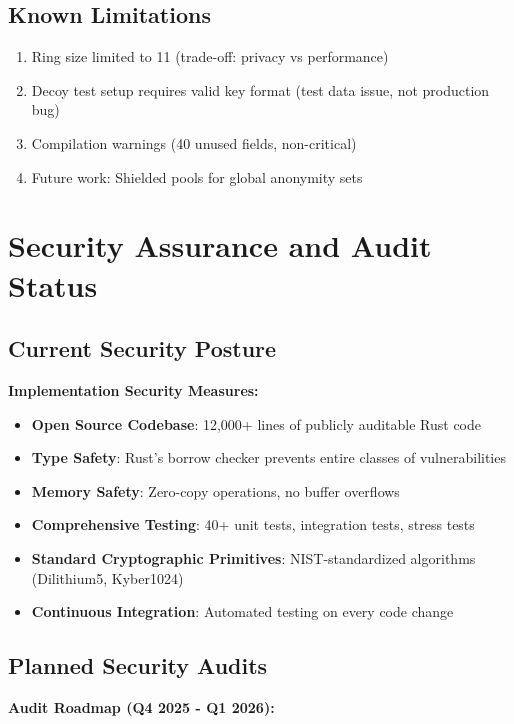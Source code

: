 \documentclass[12pt,a4paper]{article}
\begin{document}
\subsection{Known Limitations}

\begin{enumerate}
\item Ring size limited to 11 (trade-off: privacy vs performance)
\item Decoy test setup requires valid key format (test data issue, not production bug)
\item Compilation warnings (40 unused fields, non-critical)
\item Future work: Shielded pools for global anonymity sets
\end{enumerate}

\section{Security Assurance and Audit Status}

\subsection{Current Security Posture}

\textbf{Implementation Security Measures:}
\begin{itemize}
\item \textbf{Open Source Codebase}: 12,000+ lines of publicly auditable Rust code
\item \textbf{Type Safety}: Rust's borrow checker prevents entire classes of vulnerabilities
\item \textbf{Memory Safety}: Zero-copy operations, no buffer overflows
\item \textbf{Comprehensive Testing}: 40+ unit tests, integration tests, stress tests
\item \textbf{Standard Cryptographic Primitives}: NIST-standardized algorithms (Dilithium5, Kyber1024)
\item \textbf{Continuous Integration}: Automated testing on every code change
\end{itemize}

\subsection{Planned Security Audits}

\textbf{Audit Roadmap (Q4 2025 - Q1 2026):}
\end{document}
